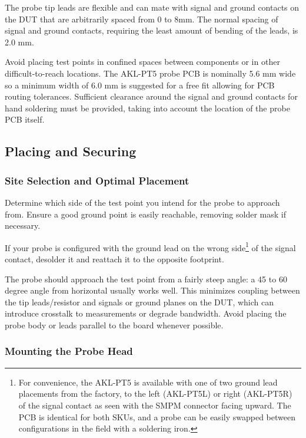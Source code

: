 \documentclass[11pt]{article}
\begin{document}
The probe tip leads are flexible and can mate with signal and ground contacts on the DUT that are arbitrarily spaced from 
0 to 8mm. The normal spacing of signal and ground contacts, requiring the least amount of bending of the leads, is 2.0 mm.

Avoid placing test points in confined spaces between components or in other difficult-to-reach locations. The AKL-PT5 
probe PCB is nominally 5.6 mm wide so a minimum width of 6.0 mm is suggested for a free fit allowing for PCB routing 
tolerances. Sufficient clearance around the signal and ground contacts for hand soldering must be provided, taking into
account the location of the probe PCB itself.


\subsection{Placing and Securing}

\subsubsection{Site Selection and Optimal Placement}

Determine which side of the test point you intend for the probe to approach from. Ensure a good ground point is
easily reachable, removing solder mask if necessary.

If your probe is configured with the ground lead on the wrong side\footnote{For convenience, the AKL-PT5 is available
with one of two ground lead placements from the factory, to the left (AKL-PT5L) or right (AKL-PT5R) of the signal
contact as seen with the SMPM connector facing upward. The PCB is identical for both SKUs, and a probe can be easily
swapped between configurations in the field with a soldering iron.} of the signal contact, desolder it and reattach it
to the opposite footprint.

The probe should approach the test point from a fairly steep angle: a 45 to 60 degree angle from horizontal usually
works well. This minimizes coupling between the tip leads/resistor and signals or ground planes on the DUT, which can
introduce crosstalk to measurements or degrade bandwidth. Avoid placing the probe body or leads parallel to the board
whenever possible.

\subsubsection{Mounting the Probe Head}
\end{document}
